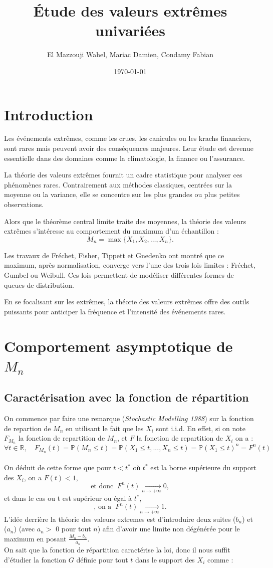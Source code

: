 \documentclass{article}
\title{Étude des valeurs extrêmes univariées}
\author{El Mazzouji Wahel, Mariac Damien, Condamy Fabian}
\date{\today}
\theoremstyle{plain}
\theoremstyle{definition}
\theoremstyle{plain}
\begin{document}
\maketitle 
\newpage
\tableofcontents 
\newpage
\section{Introduction}
Les événements extrêmes, comme les crues, les canicules ou les krachs financiers, sont rares mais peuvent avoir des conséquences majeures. Leur étude est devenue essentielle dans des domaines comme la climatologie, la finance ou l’assurance.

La théorie des valeurs extrêmes fournit un cadre statistique pour analyser ces phénomènes rares. Contrairement aux méthodes classiques, centrées sur la moyenne ou la variance, elle se concentre sur les plus grandes ou plus petites observations.

Alors que le théorème central limite traite des moyennes, la théorie des valeurs extrêmes s’intéresse au comportement du maximum d’un échantillon :
\[
M_n = \max\{X_1, X_2, \dots, X_n\}.
\]

Les travaux de Fréchet, Fisher, Tippett et Gnedenko ont montré que ce maximum, après normalisation, converge vers l’une des trois lois limites : Fréchet, Gumbel ou Weibull. Ces lois permettent de modéliser différentes formes de queues de distribution.

En se focalisant sur les extrêmes, la théorie des valeurs extrêmes offre des outils puissants pour anticiper la fréquence et l’intensité des événements rares.
\section{Comportement asymptotique de $M_n$}

\subsection{Caractérisation avec la fonction de répartition}

\noindent On commence par faire une remarque (\textit{Stochastic Modelling 1988}) sur la fonction de repartion de $M_n$ en utilisant le fait que les $X_i$ sont i.i.d.
En effet, si on note $F_{M_n}$ la fonction de repartition de $M_n$, et $F$ la fonction de repartition de $X_i$ on a :
\[
\forall t \in \mathbb{R} , \quad F_{M_n}(t) = \mathbb{P}(M_n \le t) = \mathbb{P}(X_1 \le t,...,X_n \le t)=\mathbb{P}(X_1 \le t)^n = F^n(t) 
\]
\\
On déduit de cette forme que pour $t<t^*$ où $t^*$ est la borne supérieure du support des $X_i$, on a $F(t)<1$, 
\[
\text{et donc} \; \; F^n(t) \xrightarrow[n\to +\infty]{} 0,
\]
et dans le cas ou t est supérieur ou égal à $t^*$,
\[
\text{, on a} \; \; F^n(t) \xrightarrow[n\to +\infty]{} 1.
\]
L'idée derrière la théorie des valeurs extremes est d'introduire deux suites ($b_n$) et ($a_n$) (avec $a_n > $  0 pour tout $n$) afin d'avoir une limite non dégénérée pour le maximum en posant $\frac{M_n - b_n}{a_n}$. 
\\
On sait que la fonction de répartition caractérise la loi, donc il nous suffit d'étudier la fonction $G$ définie pour tout $t$ dans le support des $X_i$ comme :
\end{document}
